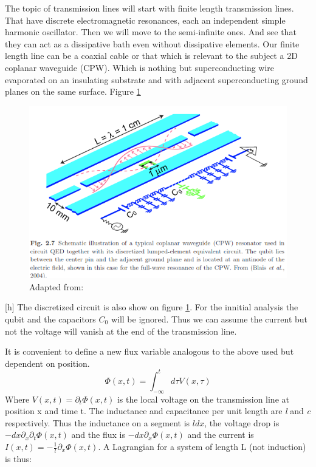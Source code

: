 \documentclass[12pt]{article}
\numberwithin{equation}{subsection}
\newcommand\page[1]{
{
}
}
\begin{document}
The topic of transmission lines will start with finite length transmission lines. That have discrete electromagnetic resonances, each an independent simple harmonic oscillator.
Then we will move to the semi-infinite ones. And see that they can act as a dissipative bath even without dissipative elements.
Our finite length line can be a coaxial cable or that which is relevant to the subject a 2D coplanar waveguide (CPW). Which is nothing but superconducting wire evaporated on an insulating substrate and with adjacent superconducting ground planes on the same surface. Figure \ref{fig:cpw}

\begin{figure}[h]
\includegraphics[scale=0.8]{images/26-cpw.png}
\caption{Adapted from: \cite{Girvin2015CircuitQS}}
\label{fig:cpw}
\end{figure}[h]
The discretized circuit is also show on figure \ref{fig:cpw}. For the innitial analysis the qubit and the capacitors $C_0$ will be ignored. Thus we can assume the current but not the voltage will vanish at the end of the transmission line.

\page{27}
It is convenient to define a new flux variable analogous to the above used but dependent on position. 
\begin{equation}
    \Phi(x,t) = \int^t_{-\infty} d\tau V(x,\tau)
\end{equation}
Where $V(x,t)= \partial_t\Phi(x,t)$ is the local voltage on the transmission line at position x and time t. The inductance and capacitance per unit length are \emph l and \emph c respectively.
Thus the inductance on a segment is $ l dx$, the voltage drop is $-dx \partial_x\partial_t\Phi(x,t)$ and the flux is $ -dx \partial _x \Phi(x,t)$ and the current is $I(x,t) = - \frac{1}{l} \partial_x \Phi(x,t)$.
A Lagrangian for a system of length L (not induction) is thus:
\end{document}
